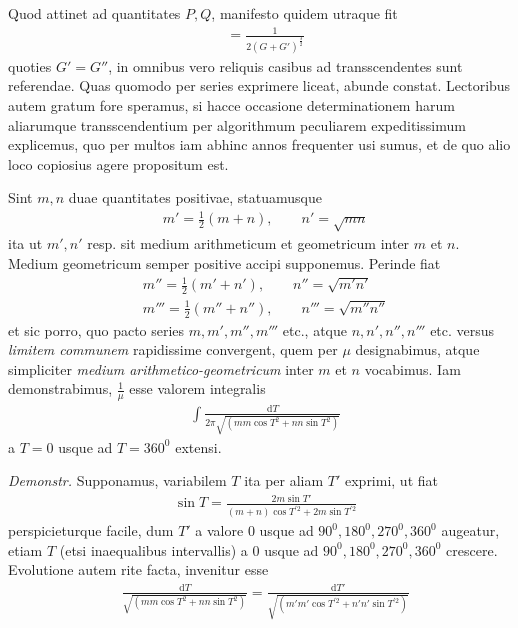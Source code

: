 Quod attinet ad quantitates $P,Q$, manifesto quidem utraque fit
\[
\begin{aligned}
&=\frac{1}{2(G+G')^{\frac32}}
\end{aligned}
\]
quoties $G'=G''$, in omnibus vero reliquis casibus ad transscendentes sunt referendae.
Quas quomodo per series exprimere liceat, abunde constat.
Lectoribus autem gratum fore speramus, si hacce occasione determinationem harum aliarumque transscendentium
per algorithmum peculiarem expeditissimum explicemus, quo per multos iam abhinc annos frequenter usi sumus,
et de quo alio loco copiosius agere propositum est.

Sint $m,n$ duae quantitates positivae, statuamusque
\[
\begin{aligned}
&m'=\frac12(m+n),\qquad n'=\surd{mn}
\end{aligned}
\]
ita ut $m',n'$ resp. sit medium arithmeticum et geometricum inter $m$ et $n$.
Medium geometricum semper positive accipi supponemus. Perinde fiat
\[
\begin{aligned}
&m''=\frac12(m'+n'),\qquad n''=\surd{m'n'}\\[8pt]
&m'''=\frac12(m''+n''),\qquad n'''=\surd{m''n''}
\end{aligned}
\]
et sic porro, quo pacto series $m,m',m'',m'''$ etc., atque $n,n',n'',n'''$ etc.
versus \emph{limitem communem} rapidissime convergent, quem per $\mu$ designabimus,
atque simpliciter \emph{medium arithmetico-geometricum} inter $m$ et $n$ vocabimus.
Iam demonstrabimus, $\frac1\mu$ esse valorem integralis
\[
\begin{aligned}
&\int\frac{\mathrm dT}{2\pi\surd{(mm\cos T^2+nn\sin T^2)}}
\end{aligned}
\]
a $T=0$ usque ad $T=360^0$ extensi.

\emph{Demonstr.} Supponamus, variabilem $T$ ita per aliam $T'$ exprimi, ut fiat
\[
\begin{aligned}
&\sin T=\frac{2m\sin T'}{(m+n)\cos T^{\prime 2}+2m\sin T^{\prime 2}}
\end{aligned}
\]
perspicieturque facile, dum $T'$ a valore $0$ usque ad $90^0,180^0,270^0,360^0$ augeatur,
etiam $T$ (etsi inaequalibus intervallis) a $0$ usque ad $90^0,180^0,270^0,360^0$ crescere.
Evolutione autem rite facta, invenitur esse
\[
\begin{aligned}
&\frac{\mathrm dT}{\surd{(mm\cos T^2+nn\sin T^2)}}
=\frac{\mathrm dT'}{\surd{(m'm'\cos T^{\prime 2}+n'n'\sin T^{\prime 2})}}
\end{aligned}
\]
